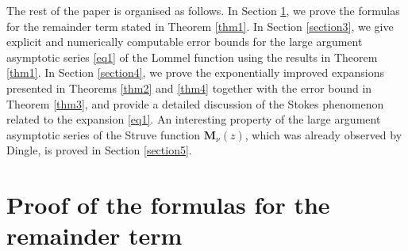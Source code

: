 \documentclass[a4paper,twoside,10pt]{amsart}
\numberwithin{equation}{section}
\begin{document}
The rest of the paper is organised as follows. In Section \ref{section2}, we prove the formulas for the remainder term stated in Theorem \ref{thm1}. In Section \ref{section3}, we give explicit and numerically computable error bounds for the large argument asymptotic series \eqref{eq1} of the Lommel function using the results in Theorem \ref{thm1}. In Section \ref{section4}, we prove the exponentially improved expansions presented in Theorems \ref{thm2} and \ref{thm4} together with the error bound in Theorem \ref{thm3}, and provide a detailed discussion of the Stokes phenomenon related to the expansion \eqref{eq1}. An interesting property of the large argument asymptotic series of the Struve function $\mathbf{M}_\nu  \left( z \right)$, which was already observed by Dingle, is proved in Section \ref{section5}.

\section{Proof of the formulas for the remainder term}\label{section2}
\end{document}
